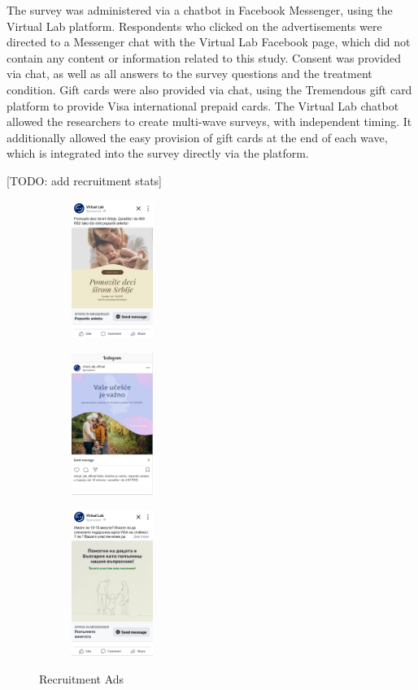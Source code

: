 \documentclass{article}
\begin{document}
The survey was administered via a chatbot in Facebook Messenger, using the Virtual Lab platform. Respondents who clicked on the advertisements were directed to a Messenger chat with the Virtual Lab Facebook page, which did not contain any content or information related to this study. Consent was provided via chat, as well as all answers to the survey questions and the treatment condition. Gift cards were also provided via chat, using the Tremendous gift card platform to provide Visa international prepaid cards. The Virtual Lab chatbot allowed the researchers to create multi-wave surveys, with independent timing. It additionally allowed the easy provision of gift cards at the end of each wave, which is integrated into the survey directly via the platform.

[TODO: add recruitment stats]


\begin{figure}[H]
\centering
\begin{subfigure}{0.3\textwidth}
\centering
\includegraphics[width=100px]{images/recruitment/558.png}
\end{subfigure}
\begin{subfigure}{0.3\textwidth}
\centering
\includegraphics[width=100px]{images/recruitment/639.png}
\end{subfigure}
\begin{subfigure}{0.3\textwidth}
\centering
\includegraphics[width=100px]{images/recruitment/742.png}
\end{subfigure}
\caption{Recruitment Ads}
\label{fig:Recruitment Ads}
\end{figure}
\end{document}
